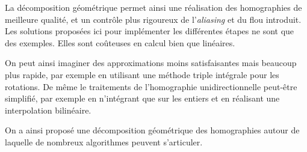 
La décomposition géométrique permet ainsi une réalisation des homographies de meilleure qualité, et un contrôle plus rigoureux de l'\emph{aliasing} et du flou introduit. Les solutions proposées ici pour implémenter les différentes étapes ne sont que des exemples. Elles sont coûteuses en calcul bien que linéaires. 

On peut ainsi imaginer des approximations moins satisfaisantes mais beaucoup plus rapide, par exemple en utilisant une méthode triple intégrale pour les rotations. De même le traitements de l'homographie unidirectionnelle peut-être simplifié, par exemple en n'intégrant que sur les entiers et en réalisant une interpolation bilinéaire.

On a ainsi proposé une décomposition géométrique des homographies autour de laquelle de nombreux algorithmes peuvent s'articuler.

